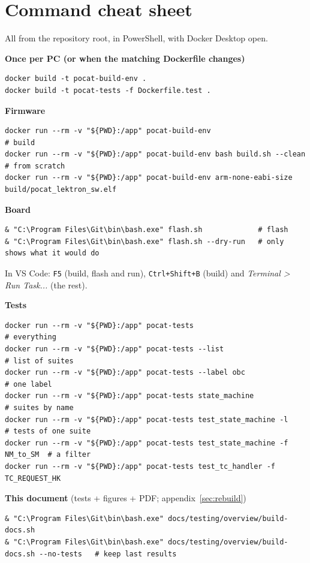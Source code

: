 \documentclass[11pt,a4paper]{article}
\DeclareRobustCommand{\_}{\textunderscore\allowbreak}
\newcommand{\cd}[1]{\texttt{#1}}
\begin{document}
\section{Command cheat sheet}\label{sec:xuleta}

All from the repository root, in PowerShell, with Docker Desktop open.

\textbf{Once per PC (or when the matching Dockerfile changes)}
\begin{lstlisting}
docker build -t pocat-build-env .
docker build -t pocat-tests -f Dockerfile.test .
\end{lstlisting}

\textbf{Firmware}
\begin{lstlisting}
docker run --rm -v "${PWD}:/app" pocat-build-env                          # build
docker run --rm -v "${PWD}:/app" pocat-build-env bash build.sh --clean    # from scratch
docker run --rm -v "${PWD}:/app" pocat-build-env arm-none-eabi-size build/pocat_lektron_sw.elf
\end{lstlisting}

\textbf{Board}
\begin{lstlisting}
& "C:\Program Files\Git\bin\bash.exe" flash.sh             # flash
& "C:\Program Files\Git\bin\bash.exe" flash.sh --dry-run   # only shows what it would do
\end{lstlisting}
In VS Code: \cd{F5} (build, flash and run), \cd{Ctrl+Shift+B} (build) and
\emph{Terminal > Run Task...} (the rest).

\textbf{Tests}
\begin{lstlisting}
docker run --rm -v "${PWD}:/app" pocat-tests                               # everything
docker run --rm -v "${PWD}:/app" pocat-tests --list                        # list of suites
docker run --rm -v "${PWD}:/app" pocat-tests --label obc                   # one label
docker run --rm -v "${PWD}:/app" pocat-tests state_machine                 # suites by name
docker run --rm -v "${PWD}:/app" pocat-tests test_state_machine -l         # tests of one suite
docker run --rm -v "${PWD}:/app" pocat-tests test_state_machine -f NM_to_SM  # a filter
docker run --rm -v "${PWD}:/app" pocat-tests test_tc_handler -f TC_REQUEST_HK
\end{lstlisting}

\textbf{This document} (tests + figures + PDF; appendix~\ref{sec:rebuild})
\begin{lstlisting}
& "C:\Program Files\Git\bin\bash.exe" docs/testing/overview/build-docs.sh
& "C:\Program Files\Git\bin\bash.exe" docs/testing/overview/build-docs.sh --no-tests   # keep last results
\end{lstlisting}
\end{document}
